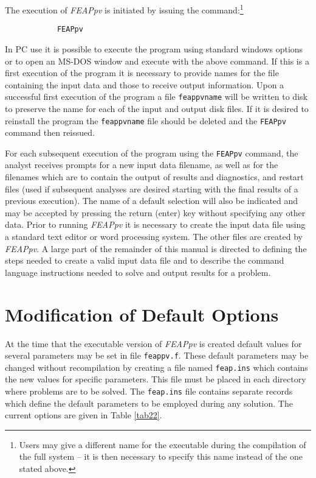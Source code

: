 The execution of {\sl FEAPpv} is initiated by issuing the command:\footnote{Users
may give a different name for the executable during the compilation of the full
system -- it is then necessary to specify this name instead of the one stated above.}
\vskip 0.1in \par\noindent
\begin{verbatim}
            FEAPpv
\end{verbatim}
In PC use it is possible to execute the program using standard windows options
or to open an MS-DOS window and execute with the above command.
If this is a first execution of the program it is necessary to
provide names for the file containing
the input data and those to receive output information.  Upon a successful first
execution of the program a file \texttt{feappvname} will be written to disk to
preserve the name for each of the input and output disk files.
If it is desired to reinstall the program the \texttt{feappvname}
file should be deleted and the \texttt{FEAPpv} command then reissued.

For each subsequent execution of the program using the \texttt{FEAPpv} command,
the analyst receives prompts for a new input data filename,
as well as for the filenames which are to contain the
output of results and diagnostics, and
restart files (used if subsequent analyses are desired starting 
with the final results of a previous execution).
The name of a default selection will also be indicated and may be accepted
by pressing the return (enter) key without specifying any other data.
Prior to running {\sl FEAPpv} it is necessary to create the input data file
using a standard text editor or word processing system. The other
files are created by {\sl FEAPpv}.  A large part of the remainder of
this manual is directed to defining
the steps needed to create a valid input data file and to describe the
command language instructions needed to solve and output results for
a problem.

\section{Modification of Default Options}

At the time that the executable version of {\sl FEAPpv} is created
default values for several parameters may be set in file {\tt feappv.f}.
These default parameters may be changed without recompilation
by creating a file named {\tt feap.ins} which contains the new values for
specific parameters.  This file must be placed in each directory where
problems are to be solved.  The {\tt feap.ins} file contains separate records
which define the default parameters to be employed during any solution.  The
current options are given in Table \ref{tab22}.

